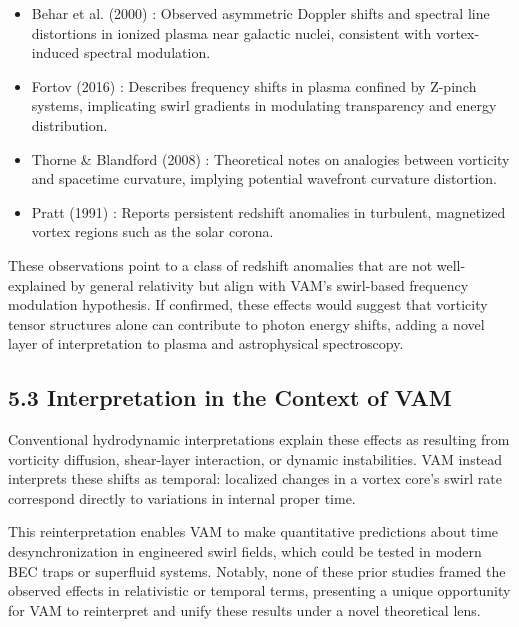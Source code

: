 \documentclass[a4paper, aps,preprint,superscriptaddress, 12pt]{revtex4}
\begin{document}
\begin{itemize}

\item Behar et al. (2000) \cite{behar2000}: Observed asymmetric Doppler shifts and spectral line distortions in ionized plasma near galactic
nuclei, consistent with vortex-induced spectral modulation.

\item Fortov (2016) \cite{fortov2016}: Describes frequency shifts in plasma confined by Z-pinch systems, implicating swirl gradients in modulating
transparency and energy distribution.

\item Thorne \& Blandford (2008) \cite{thorne2008}: Theoretical notes on analogies between vorticity and spacetime curvature, implying potential
wavefront curvature distortion.



\item Pratt (1991) \cite{pratt1991}: Reports persistent redshift anomalies in turbulent, magnetized vortex regions such as the solar corona.




\end{itemize}

These observations point to a class of redshift anomalies that are not well-explained by general relativity but align with VAM's swirl-based frequency modulation hypothesis. If confirmed, these effects would suggest that vorticity tensor structures alone can contribute to photon energy shifts, adding a novel layer of interpretation to plasma and astrophysical spectroscopy.


\subsection*{5.3 Interpretation in the Context of VAM}

Conventional hydrodynamic interpretations explain these effects as resulting from vorticity diffusion, shear-layer interaction, or dynamic instabilities. VAM instead interprets these shifts as temporal: localized changes in a vortex core's swirl rate correspond directly to variations in internal proper time.


This reinterpretation enables VAM to make quantitative predictions about time desynchronization in engineered swirl fields, which could be tested in modern BEC traps or superfluid systems. Notably, none of these prior studies framed the observed effects in relativistic or temporal terms, presenting a unique opportunity for VAM to reinterpret and unify these results under a novel theoretical lens.
\end{document}

